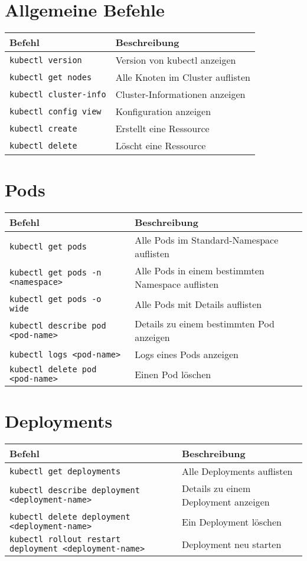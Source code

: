 \section{Allgemeine Befehle}
\begin{tabular}{|p{}|p{}|}
\hline
\textbf{Befehl} & \textbf{Beschreibung} \\
\hline
\texttt{kubectl version} & Version von kubectl anzeigen \\
\texttt{kubectl get nodes} & Alle Knoten im Cluster auflisten \\
\texttt{kubectl cluster-info} & Cluster-Informationen anzeigen \\
\texttt{kubectl config view} & Konfiguration anzeigen \\
\texttt{kubectl create} & Erstellt eine Ressource \\
\texttt{kubectl delete} & Löscht eine Ressource \\
\hline
\end{tabular}

\section{Pods}
\begin{tabular}{|p{}|p{}|}
\hline
\textbf{Befehl} & \textbf{Beschreibung} \\
\hline
\texttt{kubectl get pods} & Alle Pods im Standard-Namespace auflisten \\
\texttt{kubectl get pods -n <namespace>} & Alle Pods in einem bestimmten Namespace auflisten \\
\texttt{kubectl get pods -o wide} & Alle Pods mit Details auflisten \\
\texttt{kubectl describe pod <pod-name>} & Details zu einem bestimmten Pod anzeigen \\
\texttt{kubectl logs <pod-name>} & Logs eines Pods anzeigen \\
\texttt{kubectl delete pod <pod-name>} & Einen Pod löschen \\
\hline
\end{tabular}

\section{Deployments}
\begin{tabular}{|p{}|p{}|}
\hline
\textbf{Befehl} & \textbf{Beschreibung} \\
\hline
\texttt{kubectl get deployments} & Alle Deployments auflisten \\
\texttt{kubectl describe deployment <deployment-name>} & Details zu einem Deployment anzeigen \\
\texttt{kubectl delete deployment <deployment-name>} & Ein Deployment löschen \\
\texttt{kubectl rollout restart deployment <deployment-name>} & Deployment neu starten \\
\hline
\end{tabular}

